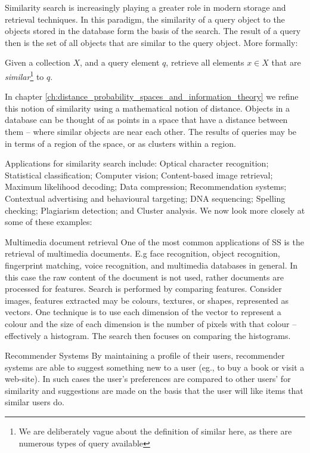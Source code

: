 Similarity search is increasingly playing a greater role in modern storage and retrieval techniques. In this paradigm, the similarity of a query object to the objects stored in the database form the basis of the search. 
The result of a query then is the set of all objects that are similar to the query object.
More formally:
%
\begin{mydef} 
Given a collection $X$, and a query element $q$, retrieve all elements $x \in X$ that are \textit{similar}\footnote{We are deliberately vague about the definition of similar here, as there are numerous types of query available} to $q$. 
\end{mydef}
%
In chapter \ref{ch:distance_probability_spaces_and_information_theory} we refine this notion of similarity using a mathematical notion of distance.
Objects in a database can be thought of as points in a space that have a distance between them -- where similar objects are near each other.  The results of queries may be in terms of a region of the space, or as clusters within a region.  

Applications for similarity search include: Optical character recognition;
 Statistical classification;
 Computer vision;
 Content-based image retrieval;
 Maximum likelihood decoding; 
 Data compression;
 Recommendation systems;
 Contextual advertising and behavioural targeting;
 DNA sequencing;
 Spelling checking; 
 Plagiarism detection; and 
 Cluster analysis.     
We now look more closely at some of these examples:
%
\begin{myexample}{Multimedia document retrieval}
One of the most common applications of SS is the retrieval of multimedia documents. E.g face recognition, object recognition, fingerprint matching, voice recognition, and multimedia databases in general. In this case the raw content of the document is not used, rather documents are processed for features.  Search is performed by comparing features.  Consider images, features extracted may be colours, textures, or shapes, represented as vectors.  One technique is to use each dimension of the vector to represent a colour and the size of each dimension is the number of pixels with that colour -- effectively a histogram.  The search then focuses on comparing the histograms.
\end{myexample}
%
\noindent 
%
\begin{myexample}{Recommender Systems}
By maintaining a profile of their users, recommender systems are able to suggest something new to a user (eg., to buy a book or visit a web-site).  In such cases the user's preferences are compared to other users' for similarity and suggestions are made on the basis that the user will like items that similar users do.
\end{myexample}
% 
